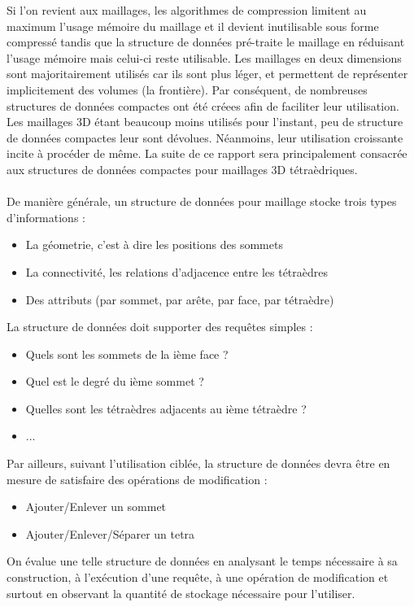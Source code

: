 \documentclass[a4paper,11pt,openany]{article}
\begin{document}
Si l'on revient aux maillages, les algorithmes de compression limitent au maximum l'usage mémoire du maillage et il devient inutilisable sous forme compressé tandis que la structure de données pré-traite le maillage en réduisant l'usage mémoire mais celui-ci reste utilisable. Les maillages en deux dimensions sont majoritairement utilisés car ils sont plus léger, et permettent de représenter implicitement des volumes (la frontière). Par conséquent, de nombreuses structures de données compactes ont été créees afin de faciliter leur utilisation. Les maillages 3D étant beaucoup moins utilisés pour l'instant, peu de structure de données compactes leur sont dévolues. Néanmoins, leur utilisation croissante incite à procéder de même. La suite de ce rapport sera principalement consacrée aux structures de données compactes pour maillages 3D tétraèdriques.\\\\
De manière générale, un structure de données pour maillage stocke trois types d'informations :
\begin{itemize}
\item La géometrie, c'est à dire les positions des sommets
\item La connectivité, les relations d'adjacence entre les tétraèdres
\item Des attributs (par sommet, par arête, par face, par tétraèdre)
\end{itemize}
La structure de données doit supporter des requêtes simples :
\begin{itemize}
\item Quels sont les sommets de la ième face ?
\item Quel est le degré du ième sommet ?
\item Quelles sont les tétraèdres adjacents au ième tétraèdre ?
\item ...
\end{itemize}
Par ailleurs, suivant l'utilisation ciblée, la structure de données devra être en mesure de satisfaire des opérations de modification :
\begin{itemize}
\item Ajouter/Enlever un sommet
\item Ajouter/Enlever/Séparer un tetra\\
\end{itemize}
On évalue une telle structure de données en analysant le temps nécessaire à sa construction, à l'exécution d'une requête, à une opération de modification et surtout en observant la quantité de stockage nécessaire pour l'utiliser.\\\\
\end{document}
